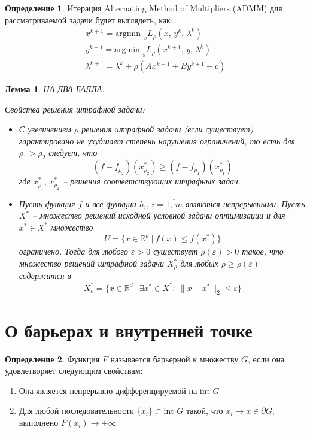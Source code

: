 \documentclass[a4paper,12pt]{article}
\renewcommand{\leq}{\ensuremath{\leqslant}}
\renewcommand{\geq}{\ensuremath{\geqslant}}
\theoremstyle{plain}
\newtheorem{lemma}{Лемма}[section]
\theoremstyle{definition}
\newtheorem{definition}{Определение}[section]
\theoremstyle{remark}
\begin{document}
\begin{definition}
  Итерация Alternating Method of Multipliers (ADMM) для рассматриваемой задачи будет выглядеть, как:
  \begin{align*}
    x^{k + 1} = \text{argmin }_x L_\rho(x,\, y^k,\, \lambda^k)\\
    y^{k + 1} = \text{argmin }_y L_\rho(x^{k + 1},\, y,\, \lambda^k)\\
    \lambda^{k + 1} = \lambda^k + \rho(Ax^{k + 1} + By^{k + 1} - c)
  \end{align*}
\end{definition}

\begin{lemma}
  НА ДВА БАЛЛА.

  Свойства решения штрафной задачи:
  \begin{itemize}
    \item С увеличением $\rho$ решения штрафной задачи (если существует) гарантировано не ухудшает степень нарушения ограничений, то есть для $\rho_1 > \rho_2$ следует, что
    \[
      (f - f_{\rho_2})(x^*_{\rho_2}) \geq (f - f_{\rho_1})(x^*_{\rho_1})
    \]
    где $x_{\rho_1}^*,\, x_{\rho_2}^*$ -- решения соответствующих штрафных задач.
    \item Пусть функция $f$ и все функции $h_i,\, i = \overline{1,\,m}$ являются непрерывными. Пусть $X^*$ -- множество решений исходной условной задачи оптимизации и для $x^* \in X^*$ множество
    \[
      U = \{x \in \mathbb{R}^d \:\vert\: f(x) \leq f(x^*)\}
    \]
    ограничено. Тогда для любого $\varepsilon > 0$ существует $\rho(\varepsilon) > 0$ такое, что множество решений штрафной задачи $X_\rho^*$ для любых $\rho \geq \rho(\varepsilon)$ содержится в
    \[
      X_\varepsilon^* = \{x \in \mathbb{R}^d \:\vert\: \exists x^* \in X^* :\: \|x - x^*\|_2 \leq \varepsilon\}
    \]
  \end{itemize}
\end{lemma}

\section{О барьерах и внутренней точке}
\begin{definition}
  Функция $F$ называется барьерной к множеству $G$, если она удовлетворяет следующим свойствам:
  \begin{enumerate}
    \item Она является непрерывно дифференцируемой на $\text{int } G$
    \item Для любой последовательности $\{x_i\} \subset \text{int }G$ такой, что $x_i \to x \in \partial G$, выполнено $F(x_i) \to +\infty$
  \end{enumerate}
\end{definition}
\end{document}

